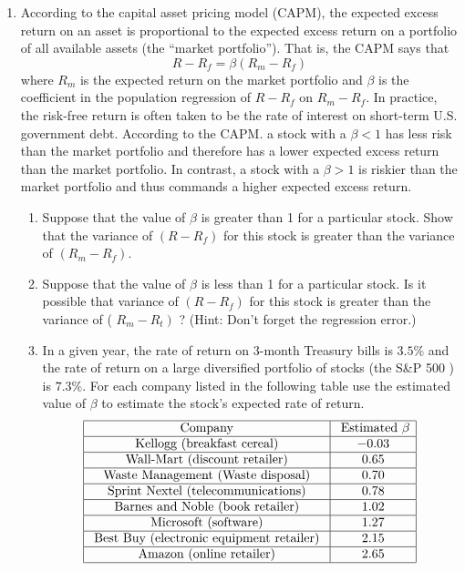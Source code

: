 \documentclass[12pt]{article}
\begin{document}
\begin{enumerate}
\item According to the capital asset pricing model (CAPM), the expected excess return on an asset is proportional to the expected excess return on a portfolio of all available assets (the ``market portfolio''). That is, the CAPM says that
$$
R-R_f=\beta\left(R_m-R_f\right)
$$
where $R_m$ is the expected return on the market portfolio and $\beta$ is the coefficient in the population regression of $R-R_f$ on $R_{m}-R_f$. In practice, the risk-free return is often taken to be the rate of interest on short-term U.S. government debt. According to the CAPM. a stock with a $\beta<1$ has less risk than the market portfolio and therefore has a lower expected excess return than the market portfolio. In contrast, a stock with a $\beta>1$ is riskier than the market portfolio and thus commands a higher expected excess return.
\begin{enumerate}
    \item Suppose that the value of $\beta$ is greater than 1 for a particular stock. Show that the variance of $\left(R-R_f\right)$ for this stock is greater than the variance of $\left(R_m-R_f\right)$.
\item Suppose that the value of $\beta$ is less than 1 for a particular stock. Is it possible that variance of $\left(R-R_f\right)$ for this stock is greater than the variance of ( $\left.R_m-R_t\right)$ ? (Hint: Don't forget the regression error.)
\item  In a given year, the rate of return on 3-month Treasury bills is $3.5 \%$ and the rate of return on a large diversified portfolio of stocks (the S\&P 500 ) is $7.3\%$. For each company listed in the following table use the estimated value of $\beta$ to estimate the stock's expected rate of return.
$$
\begin{aligned}
&\begin{array}{|c|c|}
\hline \text { Company } & \text { Estimated } \beta \\
\hline \text { Kellogg (breakfast cereal) } & -0.03 \\
\hline \text { Wall-Mart (discount retailer) } & 0.65 \\
\hline \text { Waste Management (Waste disposal) } & 0.70 \\
\hline \text { Sprint Nextel (telecommunications) } & 0.78 \\
\hline \text { Barnes and Noble (book retailer) } & 1.02 \\
\hline \text { Microsoft (software) } & 1.27 \\
\hline \text { Best Buy (electronic equipment retailer) } & 2.15 \\
\hline \text { Amazon (online retailer) } & 2.65 \\
\hline
\end{array}\\
\end{aligned}
$$
\end{enumerate}


\end{enumerate}
\end{document}

